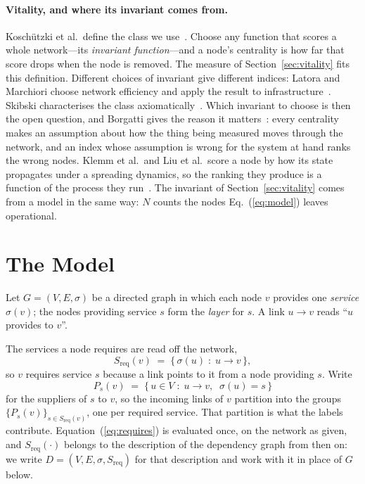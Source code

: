 \documentclass{svproc}
\begin{document}
\paragraph{Vitality, and where its invariant comes from.}
Koschützki et al.\ define the class we use~\cite{koschutzki_centrality_2005}.
Choose any function that scores a whole network---its \emph{invariant
function}---and a node's centrality is how far that score drops when the node is
removed. The measure of Section~\ref{sec:vitality} fits this definition.
Different choices of invariant give different indices: Latora and Marchiori choose
network efficiency and apply the result to
infrastructure~\cite{latora_vulnerability_2005}. Skibski characterises the class
axiomatically~\cite{skibski_vitality_2021}. Which invariant to
choose is then the open question, and Borgatti gives the reason it
matters~\cite{borgatti_centrality_2005}: every centrality makes an assumption
about how the thing being measured moves through the network, and an index whose
assumption is wrong for the system at hand ranks the wrong nodes. 
Klemm et al.\ and Liu et al.\ score a node by how its state propagates under a spreading dynamics, 
so the ranking they produce is a function of the process they run~\cite{klemm_measure_2012,liu_locating_2016}.
The invariant of Section~\ref{sec:vitality} comes from a model in the same way: $N$ counts the nodes Eq.~(\ref{eq:model}) leaves operational.
\section{The Model}
\label{sec:model}

Let $G=(V,E,\sigma)$ be a directed graph in which each node $v$ provides one
\emph{service} $\sigma(v)$; the nodes providing service $s$ form the \emph{layer}
for $s$. A link $u \to v$ reads ``$u$ provides to $v$''.

The services a node requires are read off the network,
\begin{equation}
S_{\mathrm{req}}(v) \;=\; \{\, \sigma(u) \;:\; u \to v \,\},
\label{eq:requires}
\end{equation}
so $v$ requires service $s$ because a link points to it from a node providing $s$.
Write
\begin{equation}
P_s(v) \;=\; \{\, u \in V \;:\; u \to v, \;\; \sigma(u) = s \,\}
\label{eq:suppliers}
\end{equation}
for the suppliers of $s$ to $v$, so the incoming links of $v$ partition into the
groups $\{P_s(v)\}_{s \in S_{\mathrm{req}}(v)}$, one per required service. That
partition is what the labels contribute.
Equation~(\ref{eq:requires}) is evaluated once, on the network as given, and
$S_{\mathrm{req}}(\cdot)$ belongs to the description of the dependency graph from then on: we write
$D = (V, E, \sigma, S_{\mathrm{req}})$ for that description and work with it in place of
$G$ below.
\end{document}
